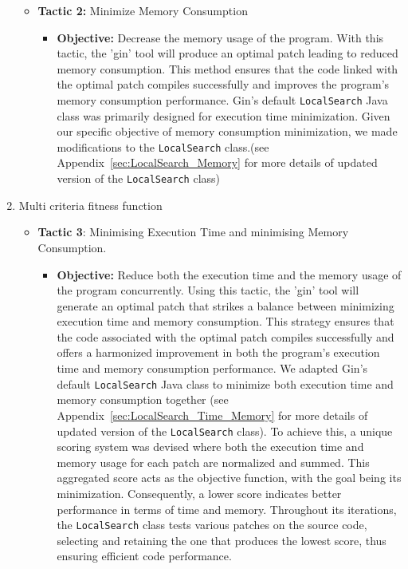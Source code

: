 \begin{enumerate}
\begin{itemize}
        \item \textbf{Tactic 2:} Minimize Memory Consumption
            \begin{itemize}
            \item \textbf{Objective:} Decrease the memory usage of the program. With this tactic, the 'gin' tool will produce an optimal patch leading to reduced memory consumption. This method ensures that the code linked with the optimal patch compiles successfully and improves the program's memory consumption performance. Gin’s default \texttt{LocalSearch} Java class was primarily designed for execution time minimization. Given our specific objective of memory consumption minimization, we made modifications to the \texttt{LocalSearch} class.(see Appendix~\ref{sec:LocalSearch_Memory} for more details of updated version of the \texttt{LocalSearch} class)
            \end{itemize}
    \end{itemize}
    \item Multi criteria fitness function
    \begin{itemize}
        \item \textbf{Tactic 3}: Minimising Execution Time and minimising Memory Consumption.
        \begin{itemize}
            \item \textbf{Objective:} Reduce both the execution time and the memory usage of the program concurrently. Using this tactic, the 'gin' tool will generate an optimal patch that strikes a balance between minimizing execution time and memory consumption. This strategy ensures that the code associated with the optimal patch compiles successfully and offers a harmonized improvement in both the program's execution time and memory consumption performance. We adapted Gin’s default \texttt{LocalSearch} Java class to minimize both execution time and memory consumption together (see Appendix~\ref{sec:LocalSearch_Time_Memory} for more details of updated version of the \texttt{LocalSearch} class). To achieve this, a unique scoring system was devised where both the execution time and memory usage for each patch are normalized and summed. This aggregated score acts as the objective function, with the goal being its minimization. Consequently, a lower score indicates better performance in terms of time and memory. Throughout its iterations, the \texttt{LocalSearch} class tests various patches on the source code, selecting and retaining the one that produces the lowest score, thus ensuring efficient code performance.
            \end{itemize}
    \end{itemize}
\end{enumerate}

